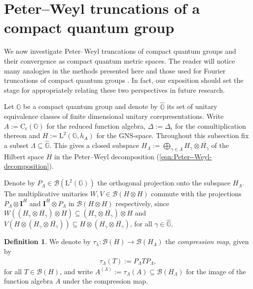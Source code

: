 \documentclass{amsart}
\theoremstyle{plain}
\theoremstyle{definition}
\newtheorem{definition}[theorem]{Definition}
\theoremstyle{remark}
\begin{document}
	
	
	\section{Peter--Weyl truncations of a compact quantum group}\label{sec:PW-truncations}
	
	We now investigate Peter--Weyl truncations of compact quantum groups and their convergence as compact quantum metric spaces.
	The reader will notice many analogies in the methods presented here and those used for Fourier truncations of compact quantum groups \cite{Rie23}.
	In fact, our exposition should set the stage for appropriately relating these two perspectives in future research.
	
	Let $\mathbb{G}$ be a compact quantum group and denote by $\widehat{\mathbb{G}}$ its set of unitary equivalence classes of finite dimensional unitary corepresentations.
	Write $A := \mathrm{C}_\mathrm{r}(\mathbb{G})$ for the reduced function algebra, $\Delta := \Delta_\mathrm{r}$ for the comultiplication thereon and $H := \mathrm{L}^2(\mathbb{G},h_A)$ for the GNS-space.
	Throughout this subsection fix a subset $\Lambda \subseteq \widehat{\mathbb{G}}$.
	This gives a closed subspace $H_\Lambda := \bigoplus_{\gamma \in \Lambda} H_\gamma \otimes \overline{H_\gamma}$ of the Hilbert space $H$ in the Peter--Weyl decomposition (\ref{eqn:Peter--Weyl-decomposition}).
	
	Denote by $P_\Lambda \in \mathcal{B}(\mathrm{L}^2(\mathbb{G}))$ the orthogonal projection onto the subspace $H_\Lambda$.
	The multiplicative unitaries $W, V \in \mathcal{B}(H \otimes H)$ commute with the projections $P_\Lambda \otimes \mathbf{I}^H$ and $\mathbf{I}^H \otimes P_\Lambda$ in $\mathcal{B}(H \otimes H)$ respectively, since $W((H_\gamma \otimes \overline{H_\gamma}) \otimes H) \subseteq (H_\gamma \otimes \overline{H_\gamma}) \otimes H$ and $V(H \otimes (H_\gamma \otimes \overline{H_\gamma})) \subseteq H \otimes (H_\gamma \otimes \overline{H_\gamma})$, for all $\gamma \in \widehat{\mathbb{G}}$.
	
	\begin{definition}
		We denote by $\tau_\lambda : \mathcal{B}(H) \rightarrow \mathcal{B}(H_\Lambda)$ the \emph{compression map}, given by
		\begin{align}
			\tau_\Lambda(T) := P_\Lambda T P_\Lambda,
		\end{align}
		for all $T \in \mathcal{B}(H)$, and write $A^{(\Lambda)} := \tau_\Lambda(A) \subseteq \mathcal{B}(H_\Lambda)$ for the image of the function algebra $A$ under the compression map.
	\end{definition}
	
\end{document}
